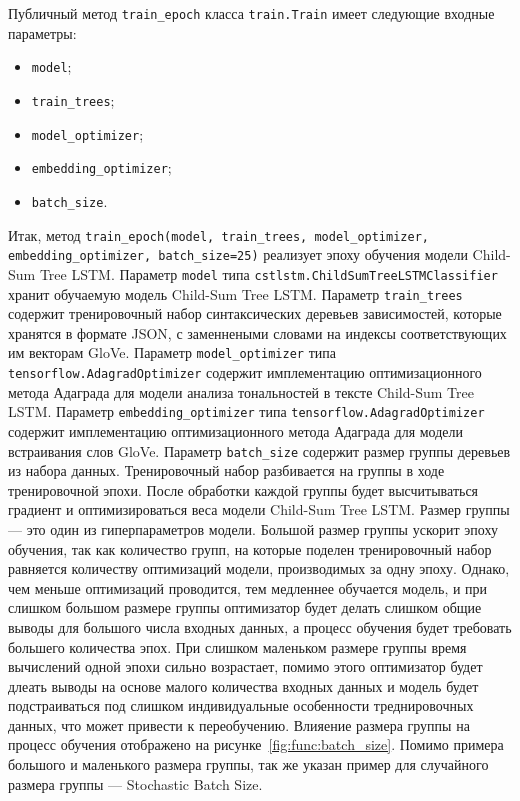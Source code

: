 Публичный метод \texttt{train\_epoch} класса \texttt{train.Train} имеет следующие входные параметры:
\begin{itemize}
\item \texttt{model};
\item \texttt{train\_trees};
\item \texttt{model\_optimizer};
\item \texttt{embedding\_optimizer};
\item \texttt{batch\_size}.
\end{itemize}

Итак, метод \texttt{train\_epoch(model, train\_trees, model\_optimizer, embedding\_optimizer, batch\_size=25)} реализует эпоху обучения модели Child-Sum Tree LSTM\@. Параметр \texttt{model} типа \texttt{cstlstm.ChildSumTreeLSTMClassifier} хранит обучаемую модель Child-Sum Tree LSTM\@. Параметр \texttt{train\_trees} содержит тренировочный набор синтаксических деревьев зависимостей, которые хранятся в формате JSON\@, с заменнеными словами на индексы соответствующих им векторам GloVe. Параметр \texttt{model\_optimizer} типа \texttt{tensorflow.AdagradOptimizer} содержит имплементацию оптимизационного метода Адаграда для модели анализа тональностей в тексте Child-Sum Tree LSTM\@. Параметр \texttt{embedding\_optimizer} типа \texttt{tensorflow.AdagradOptimizer} содержит имплементацию оптимизационного метода Адаграда для модели встраивания слов GloVe. Параметр \texttt{batch\_size} содержит размер группы деревьев из набора данных. Тренировочный набор разбивается на группы в ходе тренировочной эпохи. После обработки каждой группы будет высчитываться градиент и оптимизироваться веса модели Child-Sum Tree LSTM\@. Размер группы --- это один из гиперпараметров модели. Большой размер группы ускорит эпоху обучения, так как количество групп, на которые поделен тренировочный набор равняется количеству оптимизаций модели, производимых за одну эпоху. Однако, чем меньше оптимизаций проводится, тем медленнее обучается модель, и при слишком большом размере группы оптимизатор будет делать слишком общие выводы для большого числа входных данных, а процесс обучения будет требовать большего количества эпох. При слишком маленьком размере группы время вычислений одной эпохи сильно возрастает, помимо этого оптимизатор будет длеать выводы на основе малого количества входных данных и модель будет подстраиваться под слишком индивидуальные особенности треднировочных данных, что может привести к переобучению. Влияение размера группы на процесс обучения отображено на рисунке~\ref{fig:func:batch_size}. Помимо примера большого и маленького размера группы, так же указан пример для случайного размера группы --- Stochastic Batch Size.

